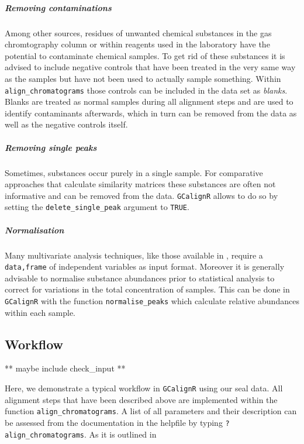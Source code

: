 \subparagraph{Removing contaminations}\label{removing-contaminations}

Among other sources, residues of unwanted chemical substances in the gas
chromtography column or within reagents used in the laboratory have the
potential to contaminate chemical samples. To get rid of these
substances it is advised to include negative controls that have been
treated in the very same way as the samples but have not been used to
actually sample something. Within \texttt{align\_chromatograms} those
controls can be included in the data set as \textit{blanks}. Blanks are
treated as normal samples during all alignment steps and are used to
identify contaminants afterwards, which in turn can be removed from the
data as well as the negative controls itself.

\subparagraph{Removing single peaks}\label{removing-single-peaks}

Sometimes, substances occur purely in a single sample. For comparative
approaches that calculate similarity matrices these substances are often
not informative and can be removed from the data. \texttt{GCalignR}
allows to do so by setting the \texttt{delete\_single\_peak} argument to
\texttt{TRUE}.

\subparagraph{Normalisation}\label{normalisation}

Many multivariate analysis techniques, like those available in
, require a \texttt{data,frame} of independent variables as
input format. Moreover it is generally advisable to normalise substance
abundances prior to statistical analysis to correct for variations in
the total concentration of samples. This can be done in
\texttt{GCalignR} with the function \texttt{normalise\_peaks} which
calculate relative abundances within each sample.

\subsection{Workflow}\label{workflow}

** maybe include check\_input **

Here, we demonstrate a typical workflow in \texttt{GCalignR} using our
seal data. All alignment steps that have been described above are
implemented within the function \texttt{align\_chromatograms}. A list of
all parameters and their description can be assessed from the
documentation in the helpfile by typing \texttt{?align\_chromatograms}.
As it is outlined in

